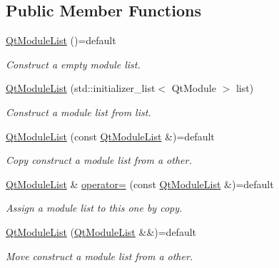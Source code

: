 \subsection*{Public Member Functions}
\begin{DoxyCompactItemize}
\item 
\hyperlink{class_mdt_1_1_deploy_utils_1_1_qt_module_list_ab23ea2c60a6bf96708beb5c383b35436}{Qt\+Module\+List} ()=default
\begin{DoxyCompactList}\small\item\em Construct a empty module list. \end{DoxyCompactList}\item 
\hyperlink{class_mdt_1_1_deploy_utils_1_1_qt_module_list_a891a99d6bb1c71d110f5efaba0996d95}{Qt\+Module\+List} (std\+::initializer\+\_\+list$<$ Qt\+Module $>$ list)
\begin{DoxyCompactList}\small\item\em Construct a module list from {\itshape list}. \end{DoxyCompactList}\item 
\hyperlink{class_mdt_1_1_deploy_utils_1_1_qt_module_list_a56486fa00efe046b3987b4d414af2806}{Qt\+Module\+List} (const \hyperlink{class_mdt_1_1_deploy_utils_1_1_qt_module_list}{Qt\+Module\+List} \&)=default
\begin{DoxyCompactList}\small\item\em Copy construct a module list from a other. \end{DoxyCompactList}\item 
\hyperlink{class_mdt_1_1_deploy_utils_1_1_qt_module_list}{Qt\+Module\+List} \& \hyperlink{class_mdt_1_1_deploy_utils_1_1_qt_module_list_acf58410a8bb13fb81e8aacbddc4ffec6}{operator=} (const \hyperlink{class_mdt_1_1_deploy_utils_1_1_qt_module_list}{Qt\+Module\+List} \&)=default
\begin{DoxyCompactList}\small\item\em Assign a module list to this one by copy. \end{DoxyCompactList}\item 
\hyperlink{class_mdt_1_1_deploy_utils_1_1_qt_module_list_a0b3220a68573bed2411c497b505623d4}{Qt\+Module\+List} (\hyperlink{class_mdt_1_1_deploy_utils_1_1_qt_module_list}{Qt\+Module\+List} \&\&)=default
\begin{DoxyCompactList}\small\item\em Move construct a module list from a other. \end{DoxyCompactList}\item 

\end{DoxyCompactItemize}
